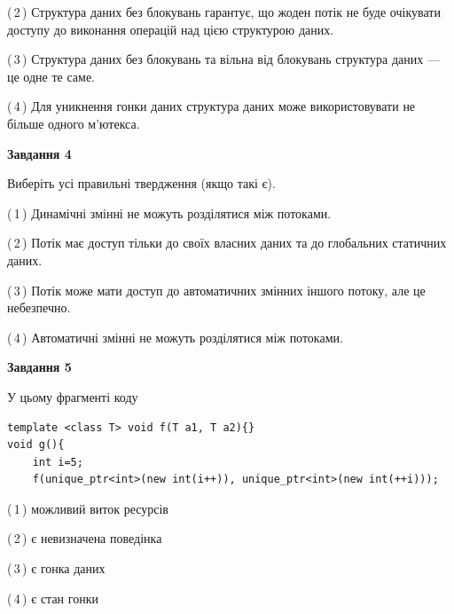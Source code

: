 \documentclass[12pt, ukrainian]{article}
\begin{document}
\begin {large}
{(\,2\,) Структура даних без блокувань гарантує, що жоден потік не буде очікувати доступу до виконання операцій над цією структурою даних.%

(\,3\,) Структура даних без блокувань та вільна від блокувань структура даних --- це одне те саме.%

(\,4\,) Для уникнення гонки даних структура даних може використовувати не більше одного м’ютекса.%



\begin{center}
\textbf{Завдання 4}
\end{center}
Виберіть усі правильні твердження (якщо такі є).\par
\vspace{2mm}

(\,1\,) Динамічні змінні не можуть розділятися між потоками.%

(\,2\,) Потік має доступ тільки до своїх власних даних та до глобальних статичних даних.%

(\,3\,) Потік може мати доступ до автоматичних змінних іншого потоку, але це небезпечно.%

(\,4\,) Автоматичні змінні не можуть розділятися між потоками.%



\begin{center}
\textbf{Завдання 5}
\end{center}
У цьому фрагменті коду
\begin{verbatim}
template <class T> void f(T a1, T a2){}
void g(){
    int i=5;
    f(unique_ptr<int>(new int(i++)), unique_ptr<int>(new int(++i)));
\end{verbatim}

(\,1\,) можливий виток ресурсів%

(\,2\,) є невизначена поведінка%

(\,3\,) є гонка даних%

(\,4\,) є стан гонки%


}
\end {large}
\end{document}
